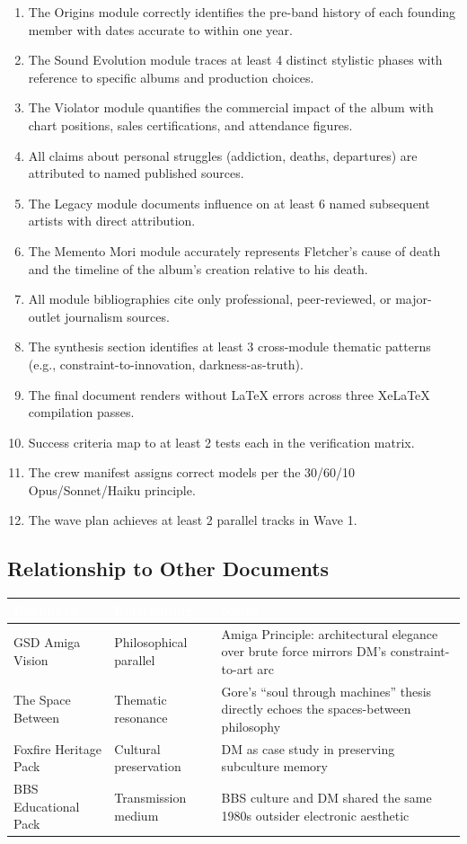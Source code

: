 \documentclass[11pt,letterpaper]{article}
\newcommand{\tableheader}[1]{\textbf{\sffamily\textcolor{white}{#1}}}
\begin{document}
\begin{enumerate}
  \item The Origins module correctly identifies the pre-band history of each founding member with dates accurate to within one year.
  \item The Sound Evolution module traces at least 4 distinct stylistic phases with reference to specific albums and production choices.
  \item The Violator module quantifies the commercial impact of the album with chart positions, sales certifications, and attendance figures.
  \item All claims about personal struggles (addiction, deaths, departures) are attributed to named published sources.
  \item The Legacy module documents influence on at least 6 named subsequent artists with direct attribution.
  \item The Memento Mori module accurately represents Fletcher's cause of death and the timeline of the album's creation relative to his death.
  \item All module bibliographies cite only professional, peer-reviewed, or major-outlet journalism sources.
  \item The synthesis section identifies at least 3 cross-module thematic patterns (e.g., constraint-to-innovation, darkness-as-truth).
  \item The final document renders without LaTeX errors across three XeLaTeX compilation passes.
  \item Success criteria map to at least 2 tests each in the verification matrix.
  \item The crew manifest assigns correct models per the 30/60/10 Opus/Sonnet/Haiku principle.
  \item The wave plan achieves at least 2 parallel tracks in Wave 1.
\end{enumerate}

\subsection{Relationship to Other Documents}

\begin{center}
\begin{tabularx}{\textwidth}{L{4cm}L{4cm}X}
\toprule
{}
\tableheader{Document} & \tableheader{Relationship} & \tableheader{Notes} \\
\midrule
GSD Amiga Vision & Philosophical parallel & Amiga Principle: architectural elegance over brute force mirrors DM's constraint-to-art arc \\
The Space Between & Thematic resonance & Gore's ``soul through machines'' thesis directly echoes the spaces-between philosophy \\
Foxfire Heritage Pack & Cultural preservation & DM as case study in preserving subculture memory \\
BBS Educational Pack & Transmission medium & BBS culture and DM shared the same 1980s outsider electronic aesthetic \\
\bottomrule
\end{tabularx}
\end{center}
\end{document}
